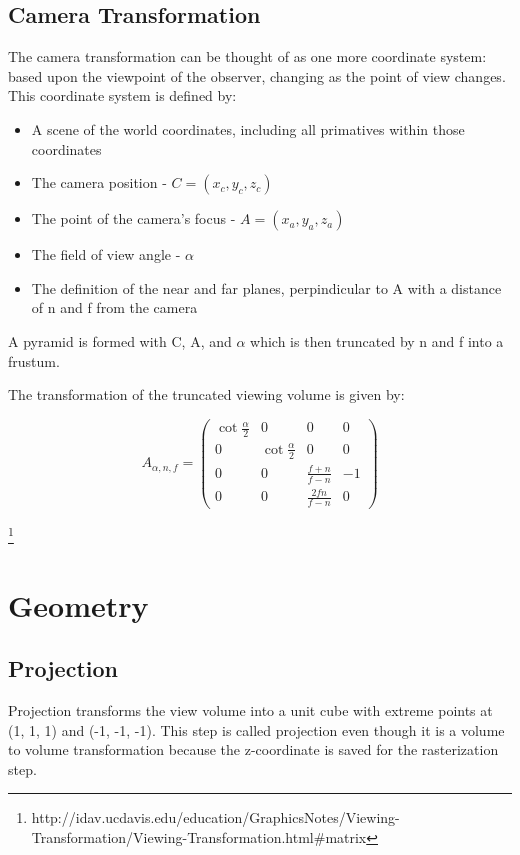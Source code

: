 \documentclass{article}
\begin{document}
\subsection{Camera Transformation}
The camera transformation can be thought of as one more coordinate system: based upon the viewpoint of the observer, changing as the point of view changes. This coordinate system is defined  by:

\begin{itemize}
\item A scene of the world coordinates, including all primatives within those coordinates
\item The camera position - $C = (x_{c}, y_{c}, z_{c})$
\item The point of the camera's focus - $A = (x_{a}, y_{a}, z_{a})$
\item The field of view angle - $\alpha$
\item The definition of the near and far planes, perpindicular to A with a distance of n and f from the camera
\end{itemize}

A pyramid is formed with C, A, and $\alpha$ which is then truncated by n and f into a frustum.

The transformation of the truncated viewing volume is given by:

\[A_{\alpha, n, f} = 
\begin{pmatrix}
\cot \frac{\alpha}{2} & 0 & 0 & 0 \\
0 & \cot \frac{\alpha}{2} & 0 & 0 \\
0 & 0 & \frac{f+n}{f-n} & -1 \\
0 & 0 & \frac{2fn}{f-n} & 0
\end{pmatrix}\]

\footnote[1]{http://idav.ucdavis.edu/education/GraphicsNotes/Viewing-Transformation/Viewing-Transformation.html\#matrix}

\section{Geometry}

\subsection{Projection}
Projection transforms the view volume into a unit cube with extreme points at (1, 1, 1) and (-1, -1, -1). This step is called projection even though it is a volume to volume transformation because the z-coordinate is saved for the rasterization step.
\end{document}
